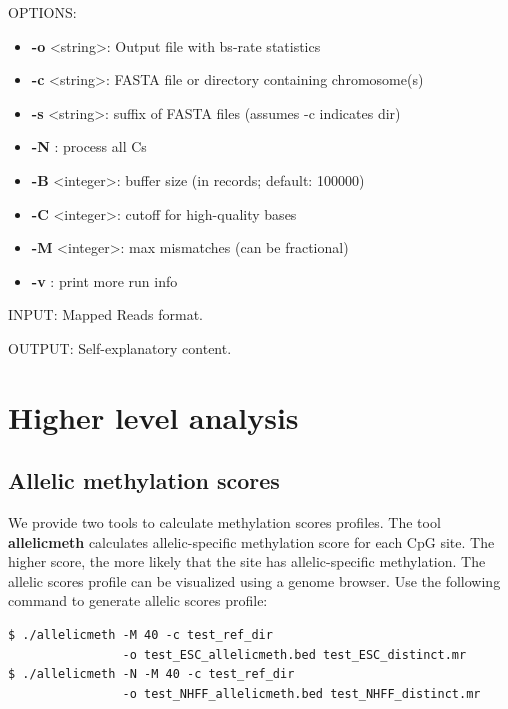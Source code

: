 \documentclass{article}
\begin{document}
OPTIONS:
\begin{itemize}
\item
\textbf{-o} \textless string\textgreater : Output file with bs-rate statistics
\item
\textbf{-c} \textless string\textgreater : FASTA file or directory containing chromosome(s)
\item
\textbf{-s} \textless string\textgreater : suffix of FASTA files (assumes -c indicates dir) 
\item
\textbf{-N} : process all Cs
\item
\textbf{-B} \textless integer\textgreater : buffer size (in records; default: 100000)
\item
\textbf{-C} \textless integer\textgreater : cutoff for high-quality bases
\item
\textbf{-M} \textless integer\textgreater : max mismatches (can be fractional)
\item
\textbf{-v} : print more run info
\end{itemize}
 
INPUT: Mapped Reads format.

OUTPUT: Self-explanatory content.

\section{Higher level analysis}
\label{sec:high-level-analys}

\subsection{Allelic methylation scores}
\label{sec:allelic_scores}

We provide two tools to calculate methylation scores profiles. The tool \textbf{allelicmeth}
calculates allelic-specific methylation score for each CpG site. The higher score,
the more likely that the site has allelic-specific methylation. The allelic scores profile
can be visualized using a genome browser. Use the following command to generate 
allelic scores profile:
\begin{verbatim}
$ ./allelicmeth -M 40 -c test_ref_dir 
                -o test_ESC_allelicmeth.bed test_ESC_distinct.mr
$ ./allelicmeth -N -M 40 -c test_ref_dir 
                -o test_NHFF_allelicmeth.bed test_NHFF_distinct.mr
\end{verbatim}
\end{document}

